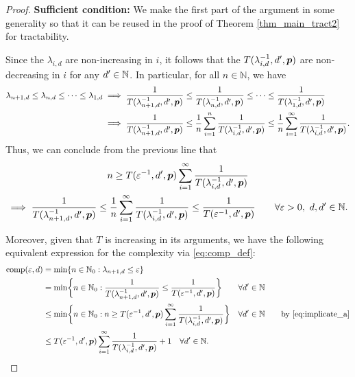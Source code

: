 \documentclass[11pt,a4paper]{article}
\newcommand{\peter}[1]{\begingroup\color{purple}#1\endgroup}
\begin{document}
\begin{proof}
\textbf{Sufficient condition:}\newline
We make the first part of the argument in some generality so that it can be reused in the proof of Theorem \ref{thm_main_tract2} for tractability.

Since the $\lambda_{i,d}$ are non-increasing in $i$, it follows that the $T(\lambda_{i,d}^{-1},d',\boldsymbol{p})$ are non-decreasing in $i$ \peter{for any $d'\in\mathbb{N}$}. In particular, for all $n\in \mathbb{N}$, we have
\begin{align*}
    \lambda_{n+1,d} \le \lambda_{n,d} \le \cdots \le \lambda_{1,d}
    & \implies \frac{1}{T(\lambda_{n+1, d}^{-1},d',\boldsymbol{p})} \le \frac{1}{T(\lambda_{n, d}^{-1},d',\boldsymbol{p})} \le \cdots \le \frac{1}{T(\lambda_{1, d}^{-1},d',\boldsymbol{p})} \\
    & \implies \frac{1}{T(\lambda_{n+1, d}^{-1},d',\boldsymbol{p}) }
    \le \frac 1n \sum_{i=1}^n  \frac{1}{T(\lambda_{i, d}^{-1},d',\boldsymbol{p}) }
    \le \frac 1n \sum_{i=1}^\infty  \frac{1}{T(\lambda_{i, d}^{-1},d',\boldsymbol{p})}.
\end{align*}
Thus, we can conclude from the previous line that
\begin{multline} \label{eq:implicate_a}
    n \ge T(\varepsilon^{-1},d',\boldsymbol{p}) \sum_{i=1}^\infty \frac{1}{T(\lambda_{i, d}^{-1},d',\boldsymbol{p})} \\
   \implies   \frac{1}{T(\lambda_{n+1, d}^{-1},d',\boldsymbol{p})} \le
   \frac 1n \sum_{i=1}^\infty \frac{1}{T(\lambda_{i, d}^{-1},d',\boldsymbol{p}) } \le \frac{1}{T(\varepsilon^{-1},d',\boldsymbol{p})} \qquad \forall \varepsilon > 0, \ d,d' \in \mathbb{N}.
\end{multline}

Moreover, given that $T$ is increasing in its arguments, we have the following equivalent expression for the complexity via \eqref{eq:comp_def}:
    \begin{align} %
    \nonumber 
    \comp(\varepsilon, d) & = \min \{n \in \natzero : \lambda_{n+1, d} \le \varepsilon\} \\
    \nonumber 
    & = \min \biggl\{n \in \natzero : \frac{1}{T(\lambda_{n+1,d}^{-1},d',\vp)}\le \frac{1}{T(\varepsilon^{-1},d',\vp) }\biggr\} \qquad \forall d' \in \naturals\\
    \nonumber 
    & \le  \min \biggl\{n \in \natzero : n \ge T(\varepsilon^{-1},d',\vp) \sum_{i=1}^\infty \frac{1}{T(\lambda_{i, d}^{-1},d',\vp)} \biggr\} \quad \forall d' \in \naturals \qquad \text{by \eqref{eq:implicate_a}} \\
    & \le  T(\varepsilon^{-1},d',\vp) \sum_{i=1}^\infty \frac{1}{T(\lambda_{i, d}^{-1},d',\vp)} + 1 \quad \forall d' \in \naturals. \label{eq:compUP}
\end{align}


\end{proof}
\end{document}

